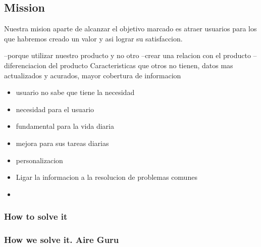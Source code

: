 \subsection{Mission}
Nuestra mision aparte de alcanzar el objetivo marcado es atraer usuarios para los que habremos creado un
valor y asi lograr su satisfaccion.
 
--porque utilizar nuestro producto y no otro 
--crear una relacion con el producto
--diferenciacion del producto 
Caracteristicas que otros no tienen, datos mas actualizados y acurados, mayor cobertura de informacion
\begin{itemize}

    \item usuario no sabe que tiene la necesidad
    \item necesidad para el usuario
    \item fundamental para la vida diaria
    \item mejora para sus tareas diarias
    \item personalizacion
    \item Ligar la informacion a la resolucion de problemas comunes
    \item \end{itemize}
\subsubsection{How to solve it} 


\subsubsection{How we solve it. Aire Guru} 
 
\begin{itemize}
    \done
    \crossed
    
\end{itemize}
\newpage